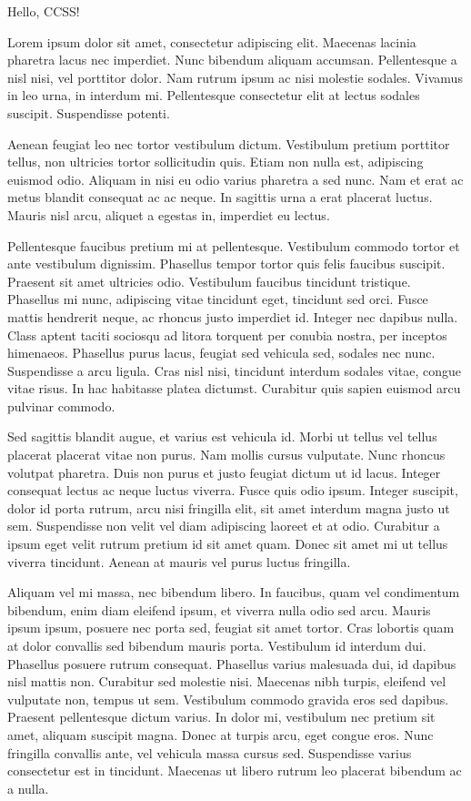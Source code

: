 \documentclass[11pt]{article}
\begin{document}
         

Hello, CCSS!

Lorem ipsum dolor sit amet, consectetur adipiscing elit. Maecenas lacinia pharetra lacus nec imperdiet. Nunc bibendum aliquam accumsan. Pellentesque a nisl nisi, vel porttitor dolor. Nam rutrum ipsum ac nisi molestie sodales. Vivamus in leo urna, in interdum mi. Pellentesque consectetur elit at lectus sodales suscipit. Suspendisse potenti.

Aenean feugiat leo nec tortor vestibulum dictum. Vestibulum pretium porttitor tellus, non ultricies tortor sollicitudin quis. Etiam non nulla est, adipiscing euismod odio. Aliquam in nisi eu odio varius pharetra a sed nunc. Nam et erat ac metus blandit consequat ac ac neque. In sagittis urna a erat placerat luctus. Mauris nisl arcu, aliquet a egestas in, imperdiet eu lectus.

Pellentesque faucibus pretium mi at pellentesque. Vestibulum commodo tortor et ante vestibulum dignissim. Phasellus tempor tortor quis felis faucibus suscipit. Praesent sit amet ultricies odio. Vestibulum faucibus tincidunt tristique. Phasellus mi nunc, adipiscing vitae tincidunt eget, tincidunt sed orci. Fusce mattis hendrerit neque, ac rhoncus justo imperdiet id. Integer nec dapibus nulla. Class aptent taciti sociosqu ad litora torquent per conubia nostra, per inceptos himenaeos. Phasellus purus lacus, feugiat sed vehicula sed, sodales nec nunc. Suspendisse a arcu ligula. Cras nisl nisi, tincidunt interdum sodales vitae, congue vitae risus. In hac habitasse platea dictumst. Curabitur quis sapien euismod arcu pulvinar commodo.

Sed sagittis blandit augue, et varius est vehicula id. Morbi ut tellus vel tellus placerat placerat vitae non purus. Nam mollis cursus vulputate. Nunc rhoncus volutpat pharetra. Duis non purus et justo feugiat dictum ut id lacus. Integer consequat lectus ac neque luctus viverra. Fusce quis odio ipsum. Integer suscipit, dolor id porta rutrum, arcu nisi fringilla elit, sit amet interdum magna justo ut sem. Suspendisse non velit vel diam adipiscing laoreet et at odio. Curabitur a ipsum eget velit rutrum pretium id sit amet quam. Donec sit amet mi ut tellus viverra tincidunt. Aenean at mauris vel purus luctus fringilla.

Aliquam vel mi massa, nec bibendum libero. In faucibus, quam vel condimentum bibendum, enim diam eleifend ipsum, et viverra nulla odio sed arcu. Mauris ipsum ipsum, posuere nec porta sed, feugiat sit amet tortor. Cras lobortis quam at dolor convallis sed bibendum mauris porta. Vestibulum id interdum dui. Phasellus posuere rutrum consequat. Phasellus varius malesuada dui, id dapibus nisl mattis non. Curabitur sed molestie nisi. Maecenas nibh turpis, eleifend vel vulputate non, tempus ut sem. Vestibulum commodo gravida eros sed dapibus. Praesent pellentesque dictum varius. In dolor mi, vestibulum nec pretium sit amet, aliquam suscipit magna. Donec at turpis arcu, eget congue eros. Nunc fringilla convallis ante, vel vehicula massa cursus sed. Suspendisse varius consectetur est in tincidunt. Maecenas ut libero rutrum leo placerat bibendum ac a nulla.
\end{document}
